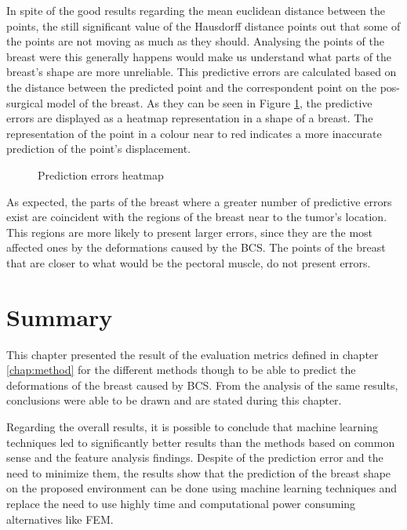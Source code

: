 In spite of the good results regarding the mean euclidean distance between the points, the still significant value of the Hausdorff distance points out that some of the points are not moving as much as they should. Analysing the points of the breast were this generally happens would make us understand what parts of the breast's shape are more unreliable. This predictive errors are calculated based on the distance between the predicted point and the correspondent point on the pos-surgical model of the breast. As they can be seen in Figure \ref{fig:heatmap}, the predictive errors are displayed as a heatmap representation in a shape of a breast. The representation of the point in a colour near to red indicates a more inaccurate prediction of the point's displacement.

\begin{figure}[!htb]
\centering
{}
\caption[Prediction errors heatmap]{Prediction errors heatmap}
\label{fig:heatmap}
\end{figure}

As expected, the parts of the breast where a greater number of predictive errors exist are coincident with the regions of the breast near to the tumor's location. This regions are more likely to present larger errors, since they are the most affected ones by the deformations caused by the BCS. The points of the breast that are closer to what would be the pectoral muscle, do not present errors.

\section{Summary}

This chapter presented the result of the evaluation metrics defined in chapter \ref{chap:method} for the different methods though to be able to predict the deformations of the breast caused by BCS. From the analysis of the same results, conclusions were able to be drawn and are stated during this chapter.

Regarding the overall results, it is possible to conclude that machine learning techniques led to significantly better results than the methods based on common sense and the feature analysis findings. Despite of the prediction error and the need to minimize them, the results show that the prediction of the breast shape on the proposed environment can be done using machine learning techniques and replace the need to use highly time and computational power consuming alternatives like FEM.  
